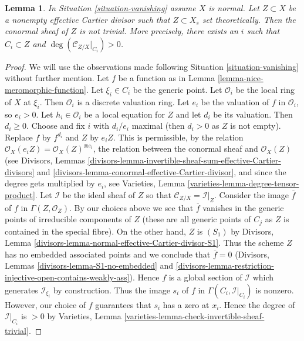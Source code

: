 \documentclass{stacks-project}
\theoremstyle{plain}
\newtheorem{lemma}[subsection]{Lemma}
\theoremstyle{definition}
\theoremstyle{remark}
\numberwithin{equation}{subsection}
\begin{document}
\begin{lemma}
\label{lemma-nontrivial-normal-bundle}
In Situation \ref{situation-vanishing} assume $X$ is normal.
Let $Z \subset X$ be a nonempty effective Cartier divisor such that
$Z \subset X_s$ set theoretically.
Then the conormal sheaf of $Z$ is not trivial.
More precisely, there exists an $i$ such that $C_i \subset Z$
and $\deg(\mathcal{C}_{Z/X}|_{C_i}) > 0$.
\end{lemma}

\begin{proof}
We will use the observations made following Situation \ref{situation-vanishing}
without further mention. Let $f$ be a function as in
Lemma \ref{lemma-nice-meromorphic-function}.
Let $\xi_i \in C_i$ be the generic point. Let
$\mathcal{O}_i$ be the local ring of $X$ at $\xi_i$. Then $\mathcal{O}_i$
is a discrete valuation ring. Let $e_i$ be the valuation of
$f$ in $\mathcal{O}_i$, so $e_i > 0$. Let $h_i \in \mathcal{O}_i$ be a local
equation for $Z$ and let $d_i$ be its valuation. Then $d_i \geq 0$.
Choose and fix $i$ with $d_i/e_i$ maximal (then $d_i > 0$ as
$Z$ is not empty). Replace $f$ by $f^{d_i}$ and $Z$ by $e_iZ$.
This is permissible, by the relation
$\mathcal{O}_X(e_i Z) = \mathcal{O}_X(Z)^{\otimes e_i}$,
the relation between the conormal sheaf and $\mathcal{O}_X(Z)$
(see Divisors, Lemmas
\ref{divisors-lemma-invertible-sheaf-sum-effective-Cartier-divisors}
and \ref{divisors-lemma-conormal-effective-Cartier-divisor}, and
since the degree gets multiplied by $e_i$, see
Varieties, Lemma \ref{varieties-lemma-degree-tensor-product}.
Let $\mathcal{I}$ be the ideal sheaf of $Z$ so that
$\mathcal{C}_{Z/X} = \mathcal{I}|_Z$. Consider the image $\overline{f}$
of $f$ in $\Gamma(Z, \mathcal{O}_Z)$. By our choices above we see
that $\overline{f}$ vanishes in the generic points of irreducible
components of $Z$ (these are all generic points of $C_j$ as $Z$ is
contained in the special fibre). On the other hand, $Z$ is $(S_1)$ by
Divisors, Lemma \ref{divisors-lemma-normal-effective-Cartier-divisor-S1}.
Thus the scheme $Z$ has no embedded associated points and
we conclude that $\overline{f} = 0$ (Divisors, Lemmas
\ref{divisors-lemma-S1-no-embedded} and
\ref{divisors-lemma-restriction-injective-open-contains-weakly-ass}).
Hence $f$ is a global section of $\mathcal{I}$
which generates $\mathcal{I}_{\xi_i}$ by construction.
Thus the image $s_i$ of $f$ in $\Gamma(C_i, \mathcal{I}|_{C_i})$ is nonzero.
However, our choice of $f$ guarantees that $s_i$ has a zero at $x_i$.
Hence the degree of $\mathcal{I}|_{C_i}$ is $> 0$ by
Varieties, Lemma \ref{varieties-lemma-check-invertible-sheaf-trivial}.
\end{proof}
\end{document}
